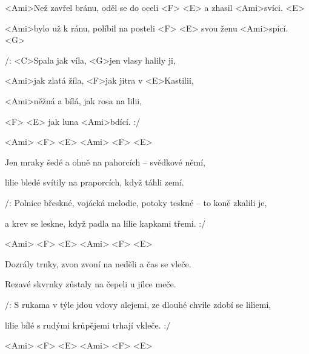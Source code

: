 

\zs
<Ami>Než zavřel bránu, oděl se do oceli <F> <E> a zhasil <Ami>svíci. <E>

<Ami>bylo už k ránu, políbil na posteli <F> <E> svou ženu <Ami>spící. <G>

/: <C>Spala jak víla, <G>jen vlasy halily ji,

<Ami>jak zlatá žíla, <F>jak jitra v <E>Kastilii,

<Ami>něžná a bílá, jak rosa na lilii,

<F> <E> jak luna <Ami>bdící. :/
\ks

<Ami> <F> <E> <Ami> <F> <E>

\zs
Jen mraky šedé a ohně na pahorcích -- svědkové němí,

lilie bledé svítily na praporcích, když táhli zemí.

/: Polnice břeskné, vojácká melodie, potoky teskné -- to koně zkalili je,

a krev se leskne, když padla na lilie kapkami třemi. :/
\ks

<Ami> <F> <E> <Ami> <F> <E>

\zs
Dozrály trnky, zvon zvoní na neděli a čas se vleče.

Rezavé skvrnky zůstaly na čepeli u jílce meče.

/: S rukama v týle jdou vdovy alejemi, ze dlouhé chvíle zdobí se liliemi,

lilie bílé s rudými krůpějemi trhají vkleče. :/
\ks

<Ami> <F> <E> <Ami> <F> <E>

\kp
